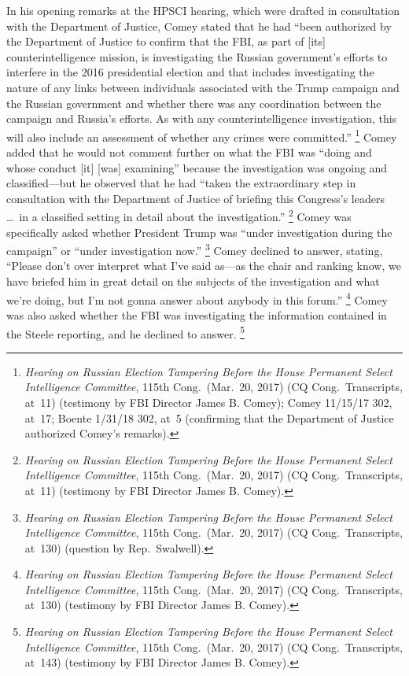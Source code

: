 In his opening remarks at the HPSCI hearing, which were drafted in consultation with the Department of Justice, Comey stated that he had ``been authorized by the Department of Justice to confirm that the FBI, as part of [its] counterintelligence mission, is investigating the Russian government's efforts to interfere in the 2016 presidential election and that includes investigating the nature of any links between individuals associated with the Trump campaign and the Russian government and whether there was any coordination between the campaign and Russia's efforts.
As with any counterintelligence investigation, this will also include an assessment of whether any crimes were committed.''%
\footnote{\textit{Hearing on Russian Election Tampering Before the House Permanent Select Intelligence Committee}, 115th Cong.\ (Mar.~20, 2017) (CQ Cong.\ Transcripts, at~11) (testimony by FBI Director James B. Comey);
Comey 11/15/17 302, at~17;
Boente 1/31/18 302, at~5 (confirming that the Department of Justice authorized Comey's remarks).}
Comey added that he would not comment further on what the FBI was ``doing and whose conduct [it] [was] examining'' because the investigation was ongoing and classified---but he observed that he had ``taken the extraordinary step in consultation with the Department of Justice of briefing this Congress's leaders \dots\ in a classified setting in detail about the investigation.''%
\footnote{\textit{Hearing on Russian Election Tampering Before the House Permanent Select Intelligence Committee}, 115th Cong.\ (Mar.~20, 2017) (CQ Cong.\ Transcripts, at~11) (testimony by FBI Director James B. Comey).}
Comey was specifically asked whether President Trump was ``under investigation during the campaign'' or ``under investigation now.''%
\footnote{\textit{Hearing on Russian Election Tampering Before the House Permanent Select Intelligence Committee}, 115th Cong.\ (Mar.~20, 2017) (CQ Cong.\ Transcripts, at~130) (question by Rep.~Swalwell).}
Comey declined to answer, stating, ``Please don't over interpret what I've said as---as the chair and ranking know, we have briefed him in great detail on the subjects of the investigation and what we're doing, but I'm not gonna answer about anybody in this forum.''%
\footnote{\textit{Hearing on Russian Election Tampering Before the House Permanent Select Intelligence Committee}, 115th Cong.\ (Mar.~20, 2017) (CQ Cong.\ Transcripts, at~130) (testimony by FBI Director James B. Comey).}
Comey was also asked whether the FBI was investigating the information contained in the Steele reporting, and he declined to answer.%
\footnote{\textit{Hearing on Russian Election Tampering Before the House Permanent Select Intelligence Committee}, 115th Cong.\ (Mar.~20, 2017) (CQ Cong.\ Transcripts, at~143) (testimony by FBI Director James B. Comey).}

